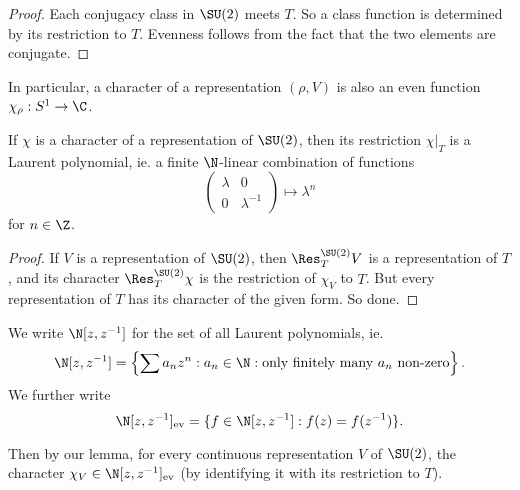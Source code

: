 \documentclass[a4paper]{article}
\begin{document}
\begin{proof}
  Each conjugacy class in $\SU(2)$ meets $T$. So a class function is determined by its restriction to $T$. Evenness follows from the fact that the two elements are conjugate.
\end{proof}

In particular, a character of a representation $(\rho, V)$ is also an even function $\chi_\rho: S^1 \to \C$.

\begin{lemma}
  If $\chi$ is a character of a representation of $\SU(2)$, then its restriction $\chi|_T$ is a Laurent polynomial, ie. a finite $\N$-linear combination of functions
  \[
    \begin{pmatrix}
      \lambda & 0\\
      0 & \lambda^{-1}
    \end{pmatrix} \mapsto \lambda^n
  \]
  for $n \in \Z$.
\end{lemma}

\begin{proof}
  If $V$ is a representation of $\SU(2)$, then $\Res_T^{\SU(2)} V$ is a representation of $T$, and its character $\Res_T^{\SU(2)} \chi$ is the restriction of $\chi_V$ to $T$. But every representation of $T$ has its character of the given form. So done.
\end{proof}

\begin{notation}
  We write $\N[z, z^{-1}]$ for the set of all Laurent polynomials, ie.
  \[
    \N[z, z^{-1}] = \left\{\sum a_n z^n: a_n \in \N: \text{only finitely many $a_n$ non-zero}\right\}.
  \]
  We further write
  \[
    \N[z, z^{-1}]_{\mathrm{ev}} = \{f \in \N[z, z^{-1}]: f(z) = f(z^{-1})\}.
  \]
\end{notation}
Then by our lemma, for every continuous representation $V$ of $\SU(2)$, the character $\chi_V \in \N[z, z^{-1}]_{\mathrm{ev}}$ (by identifying it with its restriction to $T$).
\end{document}
